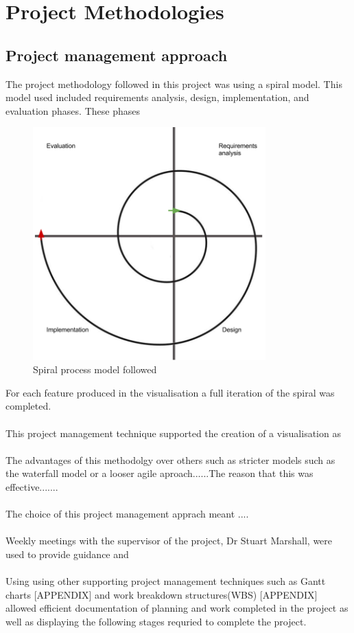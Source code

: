 
\chapter{Project Methodologies}\label{C:m}

\section{Project management approach}
The project methodology followed in this project was using a spiral model. This model used included requirements analysis, design, implementation, and evaluation phases. These phases  
\begin{figure}[h!]
  \centering
      \includegraphics[width=0.8\textwidth]{images/spiral_model.png}
  \caption{Spiral process model followed}
\end{figure}
For each feature produced in the visualisation a full iteration of the spiral was completed.
\\\\
This project management technique supported the creation of a visualisation as 
\\\\
The advantages of this methodolgy over others such as stricter models such as the waterfall model or a looser agile aproach......The reason that this was effective.......
\\\\
The choice of this project management apprach meant ....
\\\\
Weekly meetings with the supervisor of the project, Dr Stuart Marshall, were used to provide guidance and 
\\\\
Using using other supporting project management techniques such as Gantt charts [APPENDIX] and work breakdown structures(WBS) [APPENDIX] allowed efficient documentation of planning and work completed in the project as well as displaying the following stages requried to complete the project.

